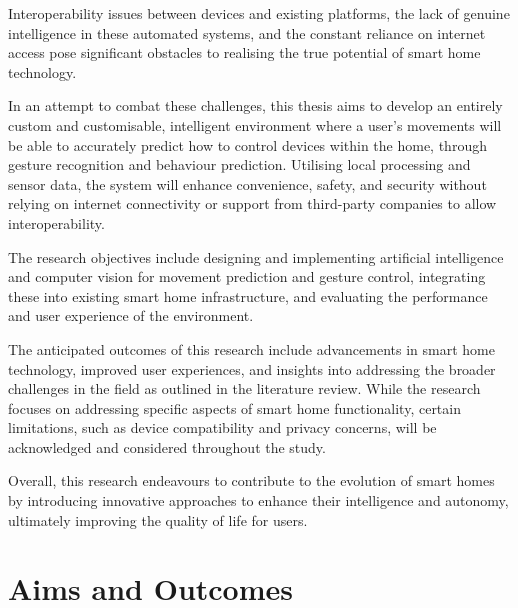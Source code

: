 Interoperability issues between devices and existing platforms, the lack of genuine intelligence in these automated systems, and the constant reliance on internet access pose significant obstacles to realising the true potential of smart home technology.

In an attempt to combat these challenges, this thesis aims to develop an entirely custom and customisable, intelligent environment where a user's movements will be able to accurately predict how to control devices within the home, through gesture recognition and behaviour prediction.
Utilising local processing and sensor data, the system will enhance convenience, safety, and security without relying on internet connectivity or support from third-party companies to allow interoperability.

The research objectives include designing and implementing artificial intelligence and computer vision for movement prediction and gesture control, integrating these into existing smart home infrastructure, and evaluating the performance and user experience of the environment.

The anticipated outcomes of this research include advancements in smart home technology, improved user experiences, and insights into addressing the broader challenges in the field as outlined in the literature review.
While the research focuses on addressing specific aspects of smart home functionality, certain limitations, such as device compatibility and privacy concerns, will be acknowledged and considered throughout the study.

Overall, this research endeavours to contribute to the evolution of smart homes by introducing innovative approaches to enhance their intelligence and autonomy, ultimately improving the quality of life for users.

\section{Aims and Outcomes}